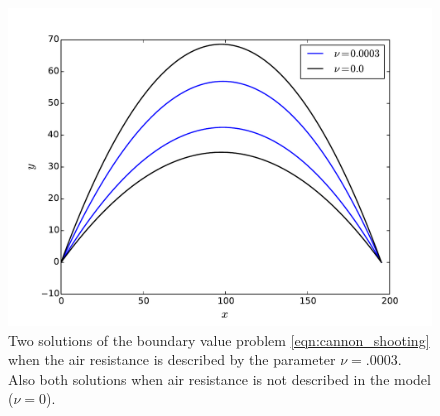 \begin{figure}[ht]
\centering
\includegraphics[width=\textwidth]{Cannon_Shooting.pdf}
\caption{Two solutions of the boundary value problem \eqref{eqn:cannon_shooting} when the air resistance is described by the parameter $\nu = .0003$.
Also both solutions when air resistance is not described in the model ($\nu = 0$).}
\label{fig:shooting_cannon_comparison2}
\end{figure}